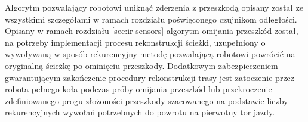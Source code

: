 Algorytm pozwalający robotowi uniknąć zderzenia z przeszkodą opisany został ze
wszystkimi szczegółami w ramach rozdziału poświęconego czujnikom odległości. Opisany w
ramach rozdziału \ref{sec:ir-sensors} algorytm omijania przeszkód został, na
potrzeby implementacji procesu rekonstrukcji ścieżki, uzupełniony o wywoływaną w
sposób rekurencyjny metodę pozwalającą robotowi powrócić na oryginalną ścieżkę
po ominięciu przeszkody. Dodatkowym zabezpieczeniem gwarantującym zakończenie
procedury rekonstrukcji trasy jest zatoczenie przez robota pełnego koła podczas
próby omijania przeszkód lub przekroczenie zdefiniowanego progu złożoności
przeszkody szacowanego na podstawie liczby rekurencyjnych wywołań potrzebnych do
powrotu na pierwotny tor jazdy. 
